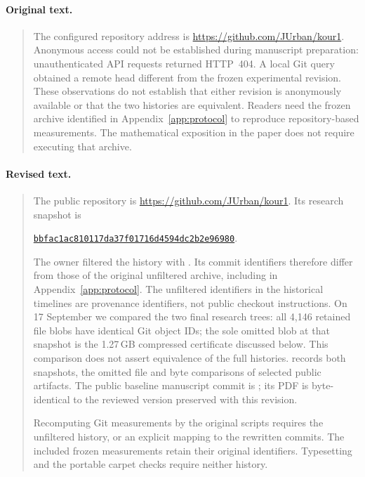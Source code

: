 \paragraph{Original text.}
\begin{quote}\small
The configured repository address is
\url{https://github.com/JUrban/kour1}.
Anonymous access could not be established during manuscript
preparation: unauthenticated API requests returned HTTP~404.
A local Git query obtained a remote head different from
the frozen experimental revision. These observations
do not establish that either revision is anonymously
available or that the two histories are equivalent.
Readers need the frozen archive identified in
Appendix~\ref{app:protocol} to reproduce repository-based
measurements. The mathematical exposition in the paper
does not require executing that archive.


\end{quote}

\paragraph{Revised text.}
\begin{quote}\small
The public repository is \url{https://github.com/JUrban/kour1}.
Its research snapshot is
\begin{center}\small
\href{https://github.com/JUrban/kour1/tree/bbfac1ac810117da37f01716d4594dc2b2e96980}{\texttt{bbfac1ac810117da37f01716d4594dc2b2e96980}}.
\end{center}
The owner filtered the history with
. Its commit identifiers therefore
differ from those of the original unfiltered archive, including
\snapshot{} in Appendix~\ref{app:protocol}. The unfiltered identifiers
in the historical timelines are provenance identifiers, not public
checkout instructions. On 17 September we compared the two final research
trees: all 4,146 retained file blobs have identical Git object IDs;
the sole omitted blob at that snapshot is the 1.27\,GB compressed
 certificate discussed below. This comparison does not
assert equivalence of the full histories.
 records both snapshots,
the omitted file and byte comparisons of selected public artifacts.
The public baseline manuscript commit is
; its PDF is byte-identical
to the reviewed version preserved with this revision.

Recomputing Git measurements by the original scripts requires the
unfiltered history, or an explicit mapping to the rewritten commits.
The included frozen measurements retain their original identifiers.
Typesetting and the portable carpet checks require neither history.


\end{quote}

